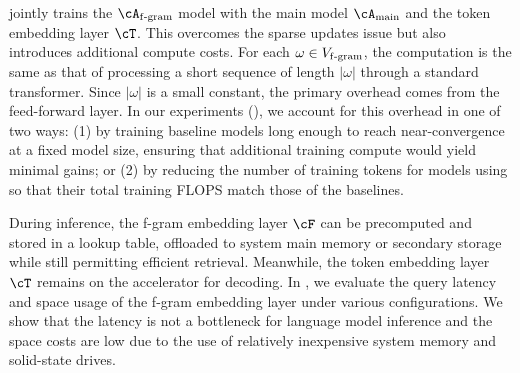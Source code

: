 \SCONE jointly trains the $\Afgram$ model with the main model $\Amain$ and the token embedding layer $\cT$. This overcomes the sparse updates issue but also introduces additional compute costs. For each $\omega\in V_{\mathrm{f\text{-}gram}}$, the computation is the same as that of  processing a short sequence of length $|\omega|$ through a standard transformer. Since $|\omega|$ is a small constant, the primary overhead comes from the feed-forward layer. In our experiments (), we account for this overhead in one of two ways: (1) by training baseline models long enough to reach near-convergence at a fixed model size, ensuring that additional training compute would yield minimal gains; or (2) by reducing the number of training tokens for models using \SCONE so that their total training FLOPS match those of the baselines.


During inference, the f-gram embedding layer $\cF$ can be precomputed and stored in a lookup table, offloaded to system main memory or secondary storage while still permitting efficient retrieval. Meanwhile, the token embedding layer $\cT$ remains on the accelerator for decoding. In , we evaluate the  query latency and space usage of the f-gram embedding layer under various configurations.  We show that the latency is not a bottleneck for language model inference and the space costs are low due to the use of relatively inexpensive system memory and solid-state drives.








